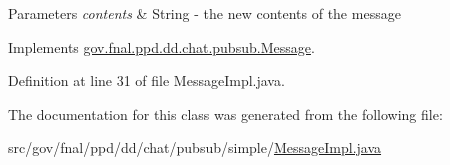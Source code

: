\begin{DoxyParams}{Parameters}
{\em contents} & String -\/ the new contents of the message \\
\hline
\end{DoxyParams}


Implements \hyperlink{interfacegov_1_1fnal_1_1ppd_1_1dd_1_1chat_1_1pubsub_1_1Message_aafbbd0b5c758ac4ce05a81e48ec2d3b8}{gov.\-fnal.\-ppd.\-dd.\-chat.\-pubsub.\-Message}.



Definition at line 31 of file Message\-Impl.\-java.



The documentation for this class was generated from the following file\-:\begin{DoxyCompactItemize}
\item 
src/gov/fnal/ppd/dd/chat/pubsub/simple/\hyperlink{MessageImpl_8java}{Message\-Impl.\-java}\end{DoxyCompactItemize}
